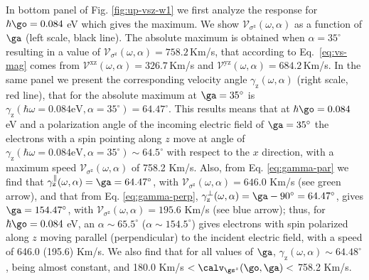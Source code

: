 \documentclass[prb,11pt,tightenlines,twocolumn,aps]{revtex4-1}
\begin{document}
In bottom panel of Fig. \ref{fig:up-vsz-w1} we first analyze the response for
$\hbar\go= 0.084$ eV which gives the maximum. We show
$\mathcal{V}_{\sigma^{\mathrm{z}}} (\omega,\alpha)$ as a function of $\ga$
(left scale, black line). The absolute maximum is obtained when $\alpha =
35^{\circ}$ resulting in a value of $\mathcal{V}_{\sigma^{\mathrm{z}}}
(\omega,\alpha) = 758.2$\,Km/s, that according to Eq.~\eqref{eq:vs-mag} comes
from $\mathcal{V}^{\mathrm{xz}}(\omega,\alpha) = 326.7$\,Km/s and
$\mathcal{V}^{\mathrm{yz}}(\omega,\alpha) = 684.2$\,Km/s.
% 
In the same panel we present the corresponding velocity angle
$\gamma_{\mathrm{z}}(\omega,\alpha)$ (right scale, red line), that for the
absolute maximum at $\ga = 35^\circ$ is $\gamma_{\mathrm{z}}(\hbar\omega =
0.084\text{eV},\alpha = 35^\circ) = 64.47^{\circ}$. This results means that at
$\hbar\go=0.084$ eV and a polarization angle of the incoming electric field of
$\ga = 35^\circ$ the electrons with a spin pointing along $z$ move at angle of
$\gamma_{\mathrm{z}}(\hbar\omega = 0.084\text{eV},\alpha=35^\circ) \sim
64.5^{\circ}$ with respect to the $x$ direction, with a  maximum speed
$\mathcal{V}_{\sigma^{\mathrm{z}}} (\omega,\alpha)$ of  758.2 Km/s. Also, from
Eq. \eqref{eq:gamma-par} we find that
$\gamma^\parallel_{\mathrm{z}}(\omega,\alpha)=\ga=64.47^\circ$, with
$\mathcal{V}_{\sigma^{\mathrm{z}}}(\omega,\alpha) = 646.0$ Km/s (see green
arrow), and that from Eq. \eqref{eq:gamma-perp},
$\gamma^\perp_{\mathrm{z}}(\omega,\alpha)=\ga-90^\circ=64.47^\circ$, gives
$\ga=154.47^\circ$, with $\mathcal{V}_{\sigma^{\mathrm{z}}}(\omega,\alpha) =
195.6$ Km/s (see blue arrow); thus, for $\hbar\go=0.084$ eV, an $\alpha \sim
65.5^\circ$ ($\alpha \sim 154.5^\circ$) gives electrons with spin polarized
along $z$ moving parallel (perpendicular) to the incident electric field,  with
a speed of 646.0 (195.6) Km/s.
% 
We also find that for all values of $\ga$, $\gamma_{\mathrm{z}}(\omega,\alpha)
\sim 64.48^{\circ}$, being almost constant, and 180.0 Km/s
$<\calv_{\gs^z}(\go,\ga)<$ 758.2 Km/s.
\end{document}
